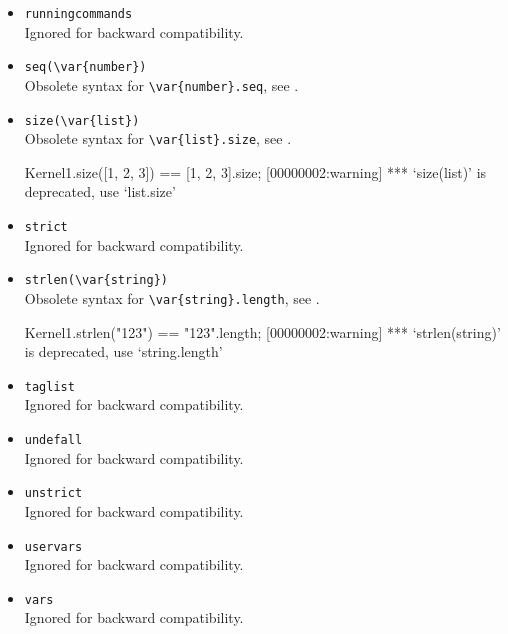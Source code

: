 \begin{itemize}
\item \lstinline|runningcommands|\\
  Ignored for backward compatibility.

\item \lstinline|seq(\var{number})|\\
  Obsolete syntax for \lstinline|\var{number}.seq|, see
  .

\item \lstinline|size(\var{list})|\\
  Obsolete syntax for \lstinline|\var{list}.size|, see
  .
\begin{urbiassert}
Kernel1.size([1, 2, 3]) == [1, 2, 3].size;
[00000002:warning] *** `size(list)' is deprecated, use `list.size'
\end{urbiassert}

\item \lstinline|strict|\\
  Ignored for backward compatibility.

\item \lstinline|strlen(\var{string})|\\
  Obsolete syntax for \lstinline|\var{string}.length|, see
  .
\begin{urbiassert}
Kernel1.strlen("123") == "123".length;
[00000002:warning] *** `strlen(string)' is deprecated, use `string.length'
\end{urbiassert}

\item \lstinline|taglist|\\
  Ignored for backward compatibility.

\item \lstinline|undefall|\\
  Ignored for backward compatibility.

\item \lstinline|unstrict|\\
  Ignored for backward compatibility.

\item \lstinline|uservars|\\
  Ignored for backward compatibility.

\item \lstinline|vars|\\
  Ignored for backward compatibility.
\end{itemize}


